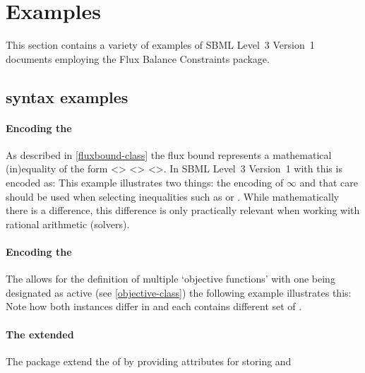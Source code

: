 
\section{Examples}
\label{examples}

This section contains a variety of examples of SBML Level~3 Version~1
documents employing the Flux Balance Constraints package.

\subsection{\FBC syntax examples}

\paragraph{Encoding the \FluxBound}
As described in \ref{fluxbound-class} the flux bound represents a mathematical (in)equality of the form <> <> <>. In SBML Level~3 Version~1 with \FBC this is encoded as:
%
%
This example illustrates two things: the encoding of $\infty$ and that care should be used when selecting inequalities such as  or . While mathematically there is a difference, this difference is only practically relevant when working with rational arithmetic (solvers).

\paragraph{Encoding the \Objective}
The \FBC allows for the definition of multiple `objective functions' with one being designated as active (see \ref{objective-class}) the following example illustrates this:
%
%
Note how both \Objective instances differ in  and each contains different set of .

\paragraph{The extended \Species}
The \FBC package extend the \SBML \Species of \sbmlthreecore by providing attributes for storing  and 
%
